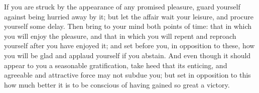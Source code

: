 If you  are struck by the  appearance of any promised  pleasure, guard yourself
against being  hurried away by  it; but let the  affair wait your  leisure, and
procure yourself some delay. Then bring to  your mind both points of time: that
in which  you will enjoy the  pleasure, and that  in which you will  repent and
reproach yourself after you have enjoyed  it; and set before you, in opposition
to these, how  you will be glad  and applaud yourself if you  abstain. And even
though it should  appear to you a seasonable gratification,  take heed that its
enticing, and  agreeable and attractive  force may not  subdue you; but  set in
opposition to this  how much better it  is to be conscious of  having gained so
great a victory.
